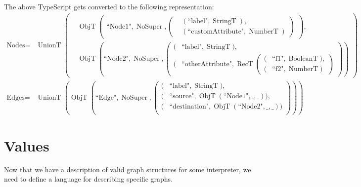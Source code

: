 \documentclass{article}
\DeclareMathOperator{\StringT}{StringT}
\DeclareMathOperator{\NumberT}{NumberT}
\DeclareMathOperator{\BooleanT}{BooleanT}
\DeclareMathOperator{\RecT}{RecT}
\DeclareMathOperator{\ObjT}{ObjT}
\DeclareMathOperator{\UnionT}{UnionT}
\DeclareMathOperator{\NoSuper}{NoSuper}
\begin{document}
The above TypeScript gets converted to the following representation:
\begin{align*}
    \text{Nodes} = &\UnionT\left(
        \begin{aligned}
        &\ObjT\left(
            \begin{aligned}    
                \text{``Node1"}, \NoSuper, \left(
                    \begin{aligned}
                        &(\text{``label"}, \StringT),  \\
                        &(\text{``customAttribute"}, \NumberT)
                    \end{aligned}\right)
            \end{aligned}\right),  \\
        &\ObjT\left(\text{``Node2"}, \NoSuper, \left(\begin{aligned}
            (&\text{``label"}, \StringT),  \\
            (&\text{``otherAttribute"}, \RecT\left(
                \begin{aligned}
                    (&\text{``f1"}, \BooleanT),  \\
                    (&\text{``f2"}, \NumberT)
                \end{aligned}\right)
        \end{aligned}\right)\right)
        \end{aligned}\right)  \\
    \text{Edges} = &\UnionT\left(\ObjT\left(
        \text{``Edge"}, \NoSuper,  
        \left(\begin{aligned}
            (&\text{``label"}, \StringT), \\
            (&\text{``source"}, \ObjT(\text{``Node1"}, \_, \_)), \\
            (&\text{``destination"}, \ObjT(\text{``Node2"}, \_, \_)) \\             
        \end{aligned}\right)\right)\right)
\end{align*}
                

\section{Values}

Now that we have a description of valid graph structures for some
interpreter, we need to define a language for describing specific 
graphs. 
\end{document}
